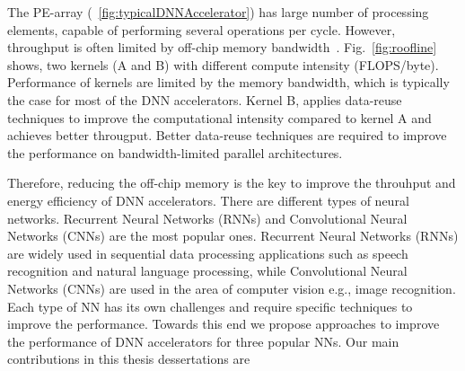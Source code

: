 \documentclass[a4paper,10pt]{article}
\begin{document}
The PE-array (\figurename{~\ref{fig:typicalDNNAccelerator}}) has large number of processing elements, capable of performing several operations per cycle. However, throughput is often limited by off-chip memory bandwidth~\cite{williams2009roofline}. Fig.~\ref{fig:roofline} shows, two kernels (A and B) with different compute intensity (FLOPS/byte). Performance of kernels are limited by the memory bandwidth, which is typically the case for most of the DNN accelerators. Kernel B, applies data-reuse techniques to improve the computational intensity compared to kernel A and achieves better througput. Better data-reuse techniques are required to improve the performance on bandwidth-limited parallel architectures. 

Therefore, reducing the off-chip memory is the key to improve the throuhput and energy efficiency of DNN accelerators. There are different types of neural networks. Recurrent Neural Networks (RNNs) and Convolutional Neural Networks (CNNs) are the most popular ones. Recurrent Neural Networks (RNNs) are widely used in sequential data processing applications such as speech recognition and natural language processing, while Convolutional Neural Networks (CNNs) are used in the area of computer vision e.g., image recognition. Each type of NN has its own challenges and require specific techniques to improve the performance. Towards this end we propose approaches to improve the performance of DNN accelerators for three popular NNs. Our main contributions in this thesis dessertations are
\end{document}
